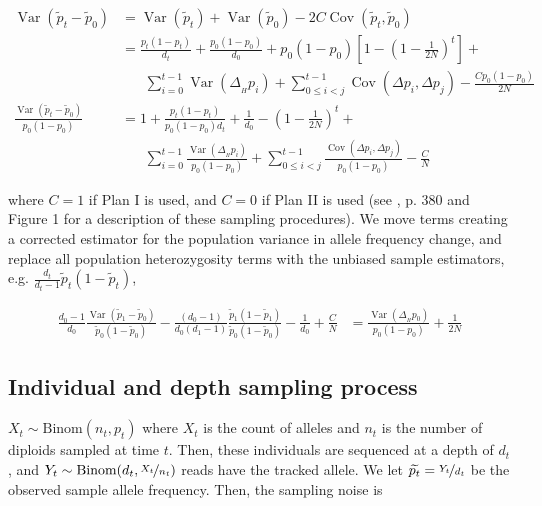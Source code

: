\documentclass[11pt]{article}
\DeclareMathOperator{\var}{Var}
\DeclareMathOperator{\cov}{Cov}
\begin{document}
\begin{align}
  \var(\widetilde{p}_t - \widetilde{p}_0) &= \var(\widetilde{p}_t) + \var(\widetilde{p}_0) - 2 C \cov(\widetilde{p}_t, \widetilde{p}_0) \\
                                          &= \frac{p_t(1-p_t)}{d_t}  + \frac{p_0(1-p_0)}{d_0} + p_0(1-p_0) \left[1 - \left(1-\frac{1}{2N}\right)^t \right] + \\ & \;\;\;\;\;\;
                                               \sum_{i=0}^{t-1} \var(\Delta_{_H} p_i)  + \sum_{0 \le i < j}^{t-1} \cov(\Delta p_i, \Delta p_j) - \frac{C p_0(1-p_0)}{2N} \\
  \frac{\var(\widetilde{p}_t - \widetilde{p}_0)}{p_0(1-p_0)} &= 1 + \frac{p_t(1-p_t)}{p_0(1-p_0)d_t}  + \frac{1}{d_0} - \left(1-\frac{1}{2N}\right)^t + \\ & \;\;\;\;\;\;
  \sum_{i=0}^{t-1} \frac{\var(\Delta_{_H} p_i)}{p_0(1-p_0)}  + \sum_{0 \le i < j}^{t-1} \frac{\cov(\Delta p_i, \Delta p_j)}{p_0(1-p_0)} - \frac{C}{N}
\end{align}

where $C = 1$ if Plan I is used, and $C=0$ if Plan II is used (see
\cite{Waples1989-sj}, p. 380 and Figure 1 for a description of these sampling
procedures). We move terms creating a corrected estimator for the population
variance in allele frequency change, and replace all population heterozygosity
terms with the unbiased sample estimators, e.g. $\frac{d_t}{d_t-1}
\widetilde{p}_t (1- \widetilde{p}_t)$,

\begin{align}
  \frac{d_0-1}{d_0} \frac{\var(\widetilde{p}_1 - \widetilde{p}_0)}{\widetilde{p}_0(1-\widetilde{p}_0)} - \frac{(d_0-1)}{d_0 (d_1 - 1)} \frac{\widetilde{p}_1(1-\widetilde{p}_1)}{\widetilde{p}_0(1-\widetilde{p}_0)} - \frac{1}{d_0} + \frac{C}{N}  &= \frac{\var(\Delta_{_H} p_0)}{p_0(1-p_0)} + \frac{1}{2N} 
\end{align}

\subsection{Individual and depth sampling process}

$X_t \sim \text{Binom}(n_t, p_t)$ where $X_t$ is the count of alleles and $n_t$
is the number of diploids sampled at time $t$. Then, these individuals are
sequenced at a depth of $d_t$, and $Y_t \sim \text{Binom}(d_t,
\nicefrac{X_t}{n_t})$ reads have the tracked allele. We let $\widetilde{p_t} =
\nicefrac{Y_t}{d_t}$ be the observed sample allele frequency. Then, the
sampling noise is 
\end{document}
